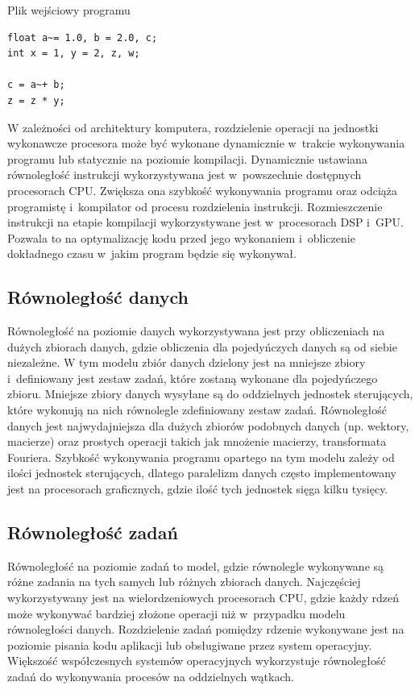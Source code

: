 \begin{program}
\caption{Plik wejściowy programu}
\begin{lstlisting}
float a~= 1.0, b = 2.0, c;
int x = 1, y = 2, z, w;

c = a~+ b;
z = z * y;
\end{lstlisting}
\end{program}

W zależności od architektury komputera, rozdzielenie operacji na jednostki wykonawcze procesora może być wykonane dynamicznie w~trakcie wykonywania programu lub statycznie na poziomie kompilacji. Dynamicznie ustawiana równoległość instrukcji wykorzystywana jest w~powszechnie dostępnych procesorach CPU. Zwiększa ona szybkość wykonywania programu oraz odciąża programistę i~kompilator od procesu rozdzielenia instrukcji. Rozmieszczenie instrukcji na etapie kompilacji wykorzystywane jest w~procesorach DSP i~GPU. Pozwala to na optymalizację kodu przed jego wykonaniem i~obliczenie dokładnego czasu w~jakim program będzie się wykonywał.  

\subsection{Równoległość danych}\label{sec:datap}

Równoległość na poziomie danych wykorzystywana jest przy obliczeniach na dużych zbiorach danych, gdzie obliczenia dla pojedyńczych danych są od siebie niezależne. W tym modelu zbiór danych dzielony jest na mniejsze zbiory i~definiowany jest zestaw zadań, które zostaną wykonane dla pojedyńczego zbioru. Mniejsze zbiory danych wysyłane są do oddzielnych jednostek sterujących, które wykonują na nich równolegle zdefiniowany zestaw zadań. Równoległość danych jest najwydajniejsza dla dużych zbiorów podobnych danych (np. wektory, macierze) oraz prostych operacji takich jak mnożenie macierzy, transformata Fouriera. Szybkość wykonywania programu opartego na tym modelu zależy od ilości jednostek sterujących, dlatego paralelizm danych często implementowany jest na procesorach graficznych, gdzie ilość tych jednostek sięga kilku tysięcy.

\subsection{Równoległość zadań}\label{sec:taskp}

Równoległość na poziomie zadań to model, gdzie równolegle wykonywane są różne zadania na tych samych lub różnych zbiorach danych. Najczęściej wykorzystywany jest na wielordzeniowych procesorach CPU, gdzie każdy rdzeń może wykonywać bardziej złożone operacji niż w~przypadku modelu równoległości danych. Rozdzielenie zadań pomiędzy rdzenie wykonywane jest na poziomie pisania kodu aplikacji lub obsługiwane przez system operacyjny. Większość współczesnych systemów operacyjnych wykorzystuje równoległość zadań do wykonywania procesów na oddzielnych wątkach.


